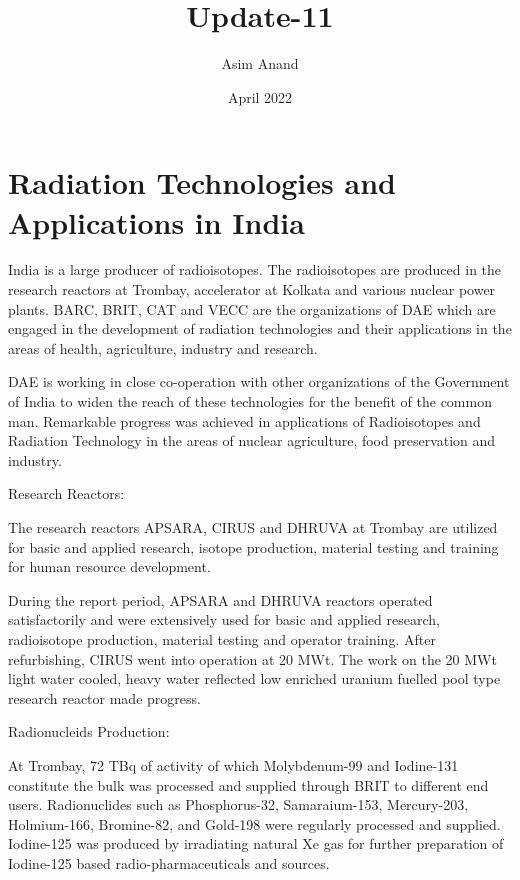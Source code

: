 \documentclass{article}
\title{Update-11}
\author{Asim Anand}
\date{April 2022}
\begin{document}
\maketitle

\section{Radiation Technologies and Applications in India}
India is a large producer of radioisotopes. The radioisotopes are produced in the research reactors at Trombay, accelerator at Kolkata and various nuclear power plants. BARC, BRIT, CAT and VECC are the organizations of DAE which are engaged in the development of radiation technologies and their applications in the areas of health, agriculture, industry and research.

DAE is working in close co-operation with other organizations of the Government of India to widen the reach of these technologies for the benefit of the common man. Remarkable progress was achieved in applications of Radioisotopes and Radiation Technology in the areas of nuclear agriculture, food preservation and industry.

Research Reactors:

The research reactors APSARA, CIRUS and DHRUVA at Trombay are utilized for basic and applied research, isotope production, material testing and training for human resource development.

During the report period, APSARA and DHRUVA reactors operated satisfactorily and were extensively used for basic and applied research, radioisotope production, material testing and operator training. After refurbishing, CIRUS went into operation at 20 MWt. The work on the 20 MWt light water cooled, heavy water reflected low enriched uranium fuelled pool type research reactor made progress.


Radionucleids Production:

At Trombay, 72 TBq of activity of which Molybdenum-99 and Iodine-131 constitute the bulk was processed and supplied through BRIT to different end users. Radionuclides such as Phosphorus-32, Samaraium-153, Mercury-203, Holmium-166, Bromine-82, and Gold-198 were regularly processed and supplied. Iodine-125 was produced by irradiating natural Xe gas for further preparation of Iodine-125 based radio-pharmaceuticals and sources.
\end{document}
